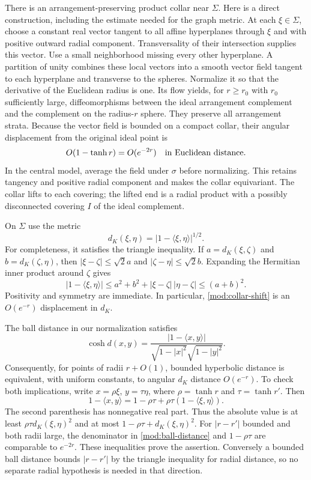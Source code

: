\documentclass[11pt,reqno]{amsart}
\numberwithin{equation}{section}
\theoremstyle{definition}
\theoremstyle{remark}
\begin{document}
There is an arrangement-preserving product collar near $\Sigma$.
Here is a direct construction, including the estimate needed for
the graph metric.  At each $\xi\in\Sigma$, choose a constant real
vector tangent to all affine hyperplanes through $\xi$ and with
positive outward radial component.  Transversality of their
intersection supplies this vector.  Use a small neighborhood
missing every other hyperplane.  A partition of unity combines
these local vectors into a smooth vector field tangent to each
hyperplane and transverse to the spheres.  Normalize it so that
the derivative of the Euclidean radius is one.  Its flow yields,
for $r\ge r_0$ with $r_0$ sufficiently large, diffeomorphisms
between the ideal arrangement complement and the complement on
the radius-$r$ sphere.  They preserve all arrangement strata.
Because the vector field is bounded on a compact collar, their
angular displacement from the original ideal point is
\begin{equation}\label{mod:collar-shift}
 O(1-\tanh r)=O(e^{-2r})
 \quad\hbox{in Euclidean distance.}
\end{equation}
In the central model, average the field under $\sigma$ before
normalizing.  This retains tangency and positive radial component
and makes the collar equivariant.  The collar lifts to each
covering; the lifted end is a radial product with a possibly
disconnected covering $I$ of the ideal complement.

On $\Sigma$ use the metric
\[
 d_K(\xi,\eta)=|1-\langle\xi,\eta\rangle|^{1/2}.
\]
For completeness, it satisfies the triangle inequality.  If
$a=d_K(\xi,\zeta)$ and $b=d_K(\zeta,\eta)$, then
$|\xi-\zeta|\le\sqrt2a$ and
$|\zeta-\eta|\le\sqrt2b$.  Expanding the Hermitian inner product
around $\zeta$ gives
\[
 |1-\langle\xi,\eta\rangle|
 \le a^2+b^2+|\xi-\zeta|\,|\eta-\zeta|
 \le(a+b)^2.
\]
Positivity and symmetry are immediate.  In particular,
\eqref{mod:collar-shift} is an $O(e^{-r})$ displacement in $d_K$.

The ball distance in our normalization satisfies
\begin{equation}\label{mod:ball-distance}
 \cosh d(x,y)=
 \frac{|1-\langle x,y\rangle|}
 {\sqrt{1-|x|^2}\sqrt{1-|y|^2}}.
\end{equation}
Consequently, for points of radii $r+O(1)$, bounded hyperbolic
distance is equivalent, with uniform constants, to angular
$d_K$ distance $O(e^{-r})$.  To check both implications, write
$x=\rho\xi$, $y=\tau\eta$, where $\rho=\tanh r$ and
$\tau=\tanh r'$.  Then
\[
 1-\langle x,y\rangle
 =1-\rho\tau+\rho\tau(1-\langle\xi,\eta\rangle).
\]
The second parenthesis has nonnegative real part.  Thus the
absolute value is at least $\rho\tau d_K(\xi,\eta)^2$ and at most
$1-\rho\tau+d_K(\xi,\eta)^2$.  For $|r-r'|$ bounded and both
radii large, the denominator in \eqref{mod:ball-distance} and
$1-\rho\tau$ are comparable to $e^{-2r}$.  These inequalities
prove the assertion.  Conversely a bounded ball distance bounds
$|r-r'|$ by the triangle inequality for radial distance, so no
separate radial hypothesis is needed in that direction.
\end{document}
